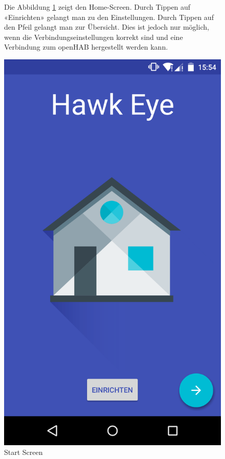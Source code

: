 \begin{figure}[htbp]
	\begin{minipage}{0.6\textwidth} 
Die Abbildung \ref{fig:screenshot_1} zeigt den Home-Screen. Durch Tippen auf «Einrichten» gelangt man zu den Einstellungen. Durch Tippen auf den Pfeil gelangt man zur Übersicht. Dies ist jedoch nur möglich, wenn die Verbindungseinstellungen korrekt sind und eine Verbindung zum openHAB hergestellt werden kann.
	\end{minipage}
	\hfill
	\begin{minipage}{0.32\textwidth}
		\includegraphics[scale=0.12]{appendix/img/AppScreenshots/Screenshot1}
		\caption{Start Screen}
		\label{fig:screenshot_1}
	\end{minipage}
\end{figure}

